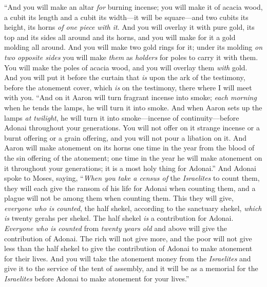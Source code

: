 \begin{biblechapter} %
 “And you will make an altar \textit{for} burning incense; you will make it of acacia wood,
\verse a cubit its length and a cubit its width—it will be square—and two cubits its height, its horns \textit{of one piece with it}.
\verse And you will overlay it with pure gold, its top and its sides all around and its horns, and you will make for it a gold molding all around.
\verse And you will make two gold rings for it; under its molding \textit{on two opposite sides} you will make \textit{them} as \textit{holders} for poles to carry it with them.
\verse You will make the poles of acacia wood, and you will overlay them \textit{with} gold.
\verse And you will put it before the curtain that \textit{is} upon the ark of the testimony, before the atonement cover, which \textit{is} on the testimony, there where I will meet with you.
\verse “And on it Aaron will turn fragrant incense into smoke; \textit{each morning} when he tends the lamps, he will turn it into smoke.
\verse And when Aaron sets up the lamps \textit{at twilight}, he will turn it into smoke—incense of continuity—before Adonai throughout your generations.
\verse You will not offer on it strange incense or a burnt offering or a grain offering, and you will not pour a libation on it.
\verse And Aaron will make atonement on its horns one time in the year from the blood of the sin offering of the atonement; one time in the year he will make atonement on it throughout your generations; it is a most holy thing for Adonai.”
 And Adonai spoke to Moses, saying,
\verse “\textit{When you take a census of} the \textit{Israelites} to count them, they will each give the ransom of his life for Adonai when counting them, and a plague will not be among them when counting them.
\verse This they will give, \textit{everyone who is counted}, the half shekel, according to the sanctuary shekel, \textit{which is} twenty gerahs per shekel. The half shekel \textit{is} a contribution for Adonai.
\verse \textit{Everyone who is counted} from \textit{twenty years old} and above will give the contribution of Adonai.
\verse The rich will not give more, and the poor will not give less than the half shekel to give the contribution of Adonai to make atonement for their lives.
\verse And you will take the atonement money from the \textit{Israelites} and give it to the service of the tent of assembly, and it will be as a memorial for the \textit{Israelites} before Adonai to make atonement for your lives.”

\end{biblechapter}
